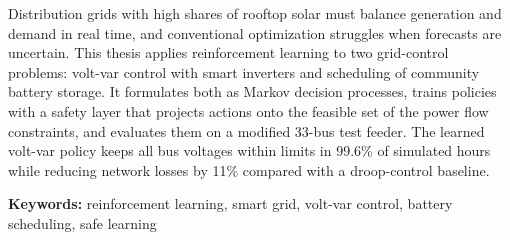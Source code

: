 Distribution grids with high shares of rooftop solar must balance generation and demand in real
time, and conventional optimization struggles when forecasts are uncertain. This thesis applies
reinforcement learning to two grid-control problems: volt-var control with smart inverters and
scheduling of community battery storage. It formulates both as Markov decision processes,
trains policies with a safety layer that projects actions onto the feasible set of the power
flow constraints, and evaluates them on a modified 33-bus test feeder. The learned volt-var
policy keeps all bus voltages within limits in 99.6\% of simulated hours while reducing network
losses by 11\% compared with a droop-control baseline.

\medskip\noindent\textbf{Keywords:} reinforcement learning, smart grid, volt-var control,
battery scheduling, safe learning
